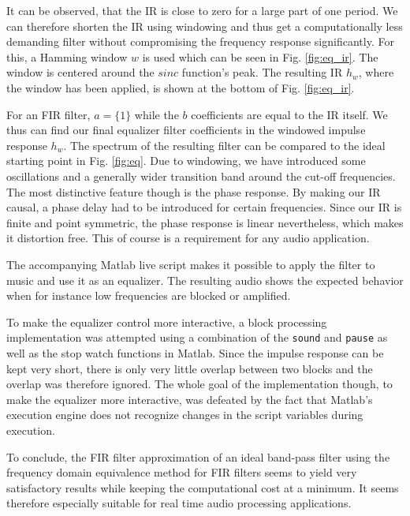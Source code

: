 \documentclass[journal]{IEEEtran}
\begin{document}
It can be observed, that the IR is close to zero for a large part of one period. We can therefore shorten the IR using windowing and thus get a computationally less demanding filter without compromising the frequency response significantly. For this, a Hamming window $w$ is used which can be seen in Fig. \ref{fig:eq_ir}. The window is centered around the $sinc$ function's peak. The resulting IR $h_w$, where the window has been applied, is shown at the bottom of Fig. \ref{fig:eq_ir}.

For an FIR filter, $a = \{1\}$ while the $b$ coefficients are equal to the IR itself. We thus can find our final equalizer filter coefficients in the windowed impulse response $h_w$. The spectrum of the resulting filter can be compared to the ideal starting point in Fig. \ref{fig:eq}. Due to windowing, we have introduced some oscillations and a generally wider transition band around the cut-off frequencies. The most distinctive feature though is the phase response. By making our IR causal, a phase delay had to be introduced for certain frequencies. Since our IR is finite and point symmetric, the phase response is linear nevertheless, which makes it distortion free. This of course is a requirement for any audio application. 

The accompanying Matlab live script makes it possible to apply the filter to music and use it as an equalizer. The resulting audio shows the expected behavior when for instance low frequencies are blocked or amplified. 

To make the equalizer control more interactive, a block processing implementation was attempted using a combination of the \texttt{sound} and \texttt{pause} as well as the stop watch functions in Matlab. Since the impulse response can be kept very short, there is only very little overlap between two blocks and the overlap was therefore ignored. The whole goal of the implementation though, to make the equalizer more interactive, was defeated by the fact that Matlab's execution engine does not recognize changes in the script variables during execution.

To conclude, the FIR filter approximation of an ideal band-pass filter using the frequency domain equivalence method for FIR filters seems to yield very satisfactory results while keeping the computational cost at a minimum. It seems therefore especially suitable for real time audio processing applications.
\end{document}
